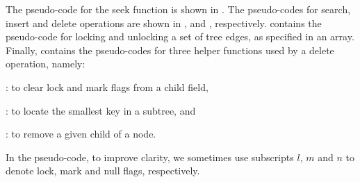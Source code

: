 \begin{limitscope}
The pseudo-code for the seek function is shown in . The 
pseudo-codes for search, insert and delete operations are shown  in 
,  and , respectively. 
 contains the pseudo-code for locking and unlocking a 
set of tree edges, as specified in an array. Finally,  contains the pseudo-codes for 
three helper functions used by a delete operation, namely:
\begin{enumerate*}[label=(\alph*)]
\item \ClearFlags{}: to clear lock and mark flags from a child field, 
\item \FindSmallest{}: to locate the smallest key in a subtree, and
\item \RemoveChild{}: to remove a given child of a node.
\end{enumerate*}

In the pseudo-code, to improve clarity, we sometimes use subscripts $l$, $m$ and $n$ to denote lock, mark and null flags, respectively.  


\end{limitscope}